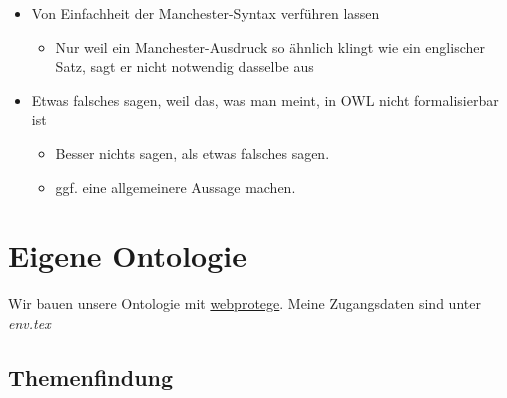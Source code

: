 \documentclass[a4paper]{article}
\begin{document}
\begin{itemize}
    \item Von Einfachheit der Manchester-Syntax verführen lassen
    \begin{itemize}
        \item Nur weil ein Manchester-Ausdruck so ähnlich klingt wie ein englischer Satz, sagt er nicht notwendig dasselbe aus
    \end{itemize}
    \item Etwas falsches sagen, weil das, was man meint, in OWL nicht formalisierbar ist
    \begin{itemize}
        \item Besser nichts sagen, als etwas falsches sagen.
        \item ggf. eine allgemeinere Aussage machen.
    \end{itemize}
\end{itemize}

\newpage
\section{Eigene Ontologie}

Wir bauen unsere Ontologie mit \href{https://webprotege.stanford.edu/#projects/e35c33c4-14c1-4121-9dec-f43c24719f06/edit/Classes?selection=Class(%3Chttp://webprotege.stanford.edu/RkOjPOSAupTHuJkOYZlvuK%3E)}{webprotege}. Meine Zugangsdaten sind unter \textit{env.tex}

\subsection{Themenfindung}
\end{document}
